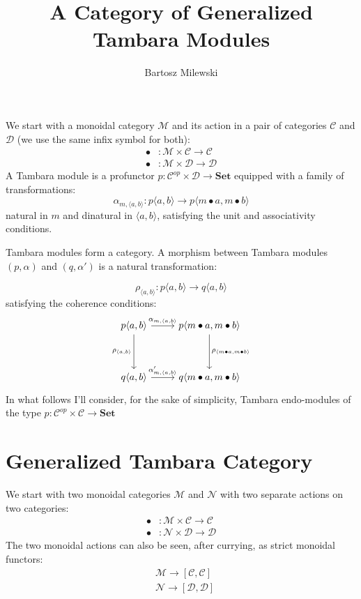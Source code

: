 \documentclass[11pt]{amsart}
\author{Bartosz Milewski}
\title{A Category of Generalized Tambara Modules}
\newcommand{\cat}[1]{\mathcal{#1}}%
\newcommand{\Cat}[1]{\mathbf{#1}}%
\begin{document}
\maketitle{}

We start with a monoidal category $\cat M$ and its action in a pair of categories $\cat C$ and $ \cat D$ (we use the same infix symbol for both):
\begin{align*} 
\bullet &\colon \cat M \times \cat C \to \cat C 
\\
 \bullet &\colon \cat M \times \cat D \to \cat D 
\end{align*}
A Tambara module is a profunctor $p \colon \cat C^{op} \times \cat D \to \Cat{Set}$ equipped with a family of transformations:
\[ \alpha_{m, \langle a, b \rangle} \colon p \langle a, b \rangle \to p \langle m \bullet a, m \bullet b \rangle \]
natural in $m$ and dinatural in $\langle a, b \rangle$, satisfying the unit and associativity conditions. 

Tambara modules form a category.  A morphism between Tambara modules $(p, \alpha)$ and $(q, \alpha')$ is a natural transformation:

\[ \rho_{\langle a, b \rangle} \colon p \langle a, b \rangle \to q \langle a, b \rangle \]
 satisfying the coherence conditions:
\[
 \begin{tikzcd}
 p \langle a, b \rangle
 \arrow[r, "{\alpha_{m, \langle a, b \rangle}}"]
 \arrow[dd, "{\rho_{ \langle a, b \rangle}}"']
& p \langle m \bullet a, m \bullet b \rangle
 \arrow[dd, "{\rho_{\langle m \bullet a, m \bullet b \rangle}}"]
 \\
  \\
 q \langle a, b \rangle
 \arrow[r, "{\alpha'_{m, \langle a, b \rangle}}"]
& q \langle m \bullet a, m \bullet b \rangle
 \end{tikzcd}
\]
In what follows I'll consider, for the sake of simplicity, Tambara endo-modules of the type  $p \colon \cat C^{op} \times \cat C \to \Cat{Set}$

\section{Generalized Tambara Category}

We start with two monoidal categories $\cat M$ and $\cat N$ with two separate actions on two categories:
\begin{align*} 
\bullet &\colon \cat M \times \cat C \to \cat C 
\\
 \bullet &\colon \cat N \times \cat D \to \cat D 
\end{align*}
The two monoidal actions can also be seen, after currying, as strict monoidal functors:
\begin{align*}
&\cat M \to [\cat C, \cat C]
\\
&\cat N \to [\cat D, \cat D]
\end{align*}
\end{document}
